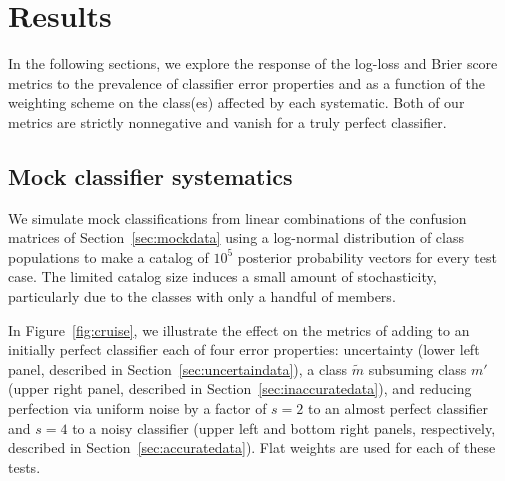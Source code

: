 \section{Results}
\label{sec:results}

In the following sections, we explore the response of the log-loss and Brier score metrics to the prevalence of classifier error properties and as a function of the weighting scheme on the class(es) affected by each systematic.
Both of our metrics are strictly nonnegative and vanish for a truly perfect classifier.

\subsection{Mock classifier systematics}
\label{sec:mockresults}

We simulate mock classifications from linear combinations of the confusion matrices of Section~\ref{sec:mockdata} using a log-normal distribution of class populations to make a catalog of $10^{5}$ posterior probability vectors for every test case.
The limited catalog size induces a small amount of stochasticity, particularly due to the classes with only a handful of members.

In Figure~\ref{fig:cruise}, we illustrate the effect on the metrics of adding to an initially perfect classifier each of four error properties:
uncertainty (lower left panel, described in Section~\ref{sec:uncertaindata}),
a class $\tilde{m}$ subsuming class $m'$ (upper right panel, described in Section~\ref{sec:inaccuratedata}),
and reducing perfection via uniform noise by a factor of $s=2$ to an almost perfect classifier and $s=4$ to a noisy classifier (upper left and bottom right panels, respectively, described in Section~\ref{sec:accuratedata}).
Flat weights are used for each of these tests.

